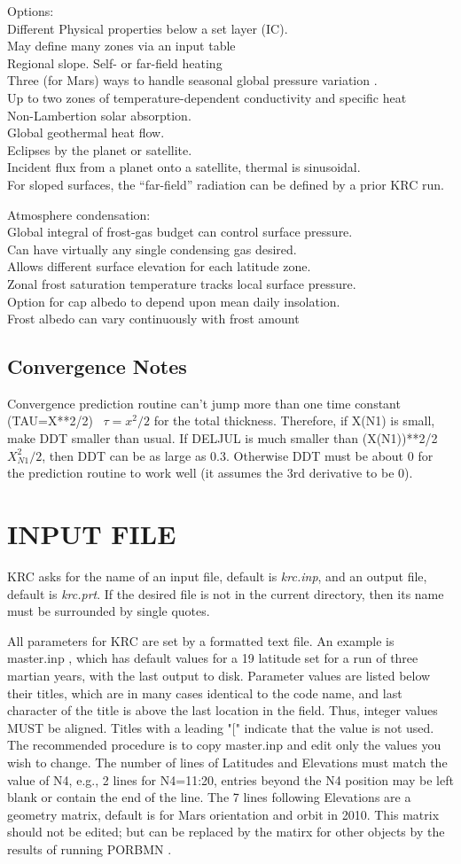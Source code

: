 \documentclass{article}
\newcommand{\qi}{\\ \hspace*{2.em}}      %
\newcommand{\qii}{\\ \hspace*{4.em}}     %
\newcommand{\nf}{\textit}  %
\begin{document}
Options:
\qi  Different Physical properties below a set layer (IC). 
\qii May define many zones via an input table
\qi  Regional slope. Self- or far-field heating
\qi  Three (for Mars) ways to handle seasonal global pressure variation .
\qi  Up to two zones of temperature-dependent conductivity and specific heat
\qi Non-Lambertion solar absorption.
\qi Global geothermal heat flow.
\qi Eclipses by the planet or satellite.
\qi Incident flux from a planet onto a satellite, thermal is sinusoidal.
\qi For sloped surfaces, the ``far-field'' radiation can be defined by a prior KRC run.

Atmosphere condensation: 
\qi Global integral of frost-gas budget can control surface pressure.
\qii Can have virtually any single condensing gas desired.
\qi Allows different surface elevation for each latitude zone.
\qii  Zonal frost saturation temperature tracks local surface pressure.
\qi Option for cap albedo to depend upon mean daily insolation.
\qii Frost albedo can vary continuously with frost amount

\subsection{Convergence Notes} %

Convergence prediction routine can't jump more than one time constant
(TAU=X**2/2) \ $\tau =x^2/2$ for the total thickness.  Therefore, if X(N1) is
small, make DDT smaller than usual.  If DELJUL is much smaller than (X(N1))**2/2
\ $X_{N1}^2/2$, then DDT can be as large as 0.3.  Otherwise DDT must be about 0
for the prediction routine to work well (it assumes the 3rd derivative to be 0).

\section{INPUT FILE}

KRC asks for the name of an input file, default is \nf{krc.inp}, and an output
file, default is \nf{krc.prt}. If the desired file is not in the current
directory, then its name must be surrounded by single quotes.

All parameters for KRC are set by a formatted text file.  An example is
master.inp , which has default values for a 19 latitude set for a run of three
martian years, with the last output to disk. Parameter values are listed below
their titles, which are in many cases identical to the code name, and last
character of the title is above the last location in the field. Thus, integer
values MUST be aligned. Titles with a leading "[" indicate that the value is not
used. The recommended procedure is to copy master.inp and edit only the values
you wish to change. The number of lines of Latitudes and Elevations must match
the value of N4, e.g., 2 lines for N4=11:20, entries beyond the N4 position may
be left blank or contain the end of the line. The 7 lines following Elevations
are a geometry matrix, default is for Mars orientation and orbit in 2010. This matrix should not be edited; but can be replaced by the matirx for other objects by the results of running PORBMN .
\end{document}
